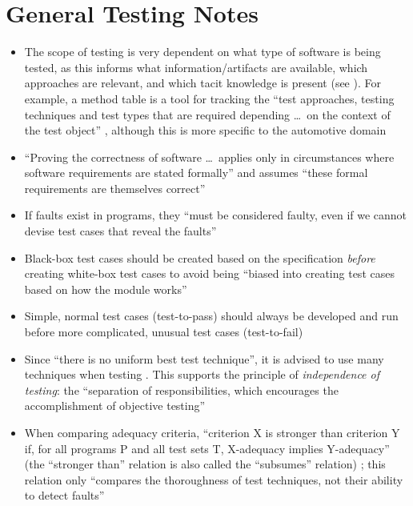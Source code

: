 \section{General Testing Notes}

\begin{itemize}
      \item The scope of testing is very dependent on what type of software
            is being tested, as this informs what information/artifacts are
            available, which approaches are relevant, and which tacit knowledge
            is present (see ). For example, a method table
            is a tool for tracking the ``test approaches, testing techniques
            and test types that are required depending \dots\ on the context of
            the test object'' \citepISTQB{} , although
            this is more specific to the automotive domain
      \item ``Proving the correctness of software \dots\ applies only in
            circumstances where software requirements are stated formally'' and
            assumes ``these formal requirements are themselves correct''
            \citep[p.~398]{vanVliet2000}
      \item If faults exist in programs, they ``must be considered faulty, even
            if we cannot devise test cases that reveal the faults''
            \citep[p.~401]{vanVliet2000}
      \item Black-box test cases should be created based on the specification
            \emph{before} creating white-box test cases to avoid being ``biased
            into creating test cases based on how the module works''
            \citep[p.~113]{Patton2006}
      \item Simple, normal test cases (test-to-pass) should always be developed
            and run before more complicated, unusual test cases (test-to-fail)
            \citep[p.~66]{Patton2006}
      \item Since ``there is no uniform best test technique'', it is advised to
            use many techniques when testing \citep[p.~440]{vanVliet2000}.
            This supports the principle of \emph{independence of testing}: the
            ``separation of responsibilities, which encourages the
            accomplishment of objective testing'' \citepISTQB{}
      \item When comparing adequacy criteria, ``criterion X is stronger than
            criterion Y if, for all programs P and all test sets T, X-adequacy
            implies Y-adequacy'' (the ``stronger than'' relation is also called
            the ``subsumes'' relation) \citep[p.~432]{vanVliet2000};
            this relation only ``compares the thoroughness of test techniques,
            not their ability to detect faults'' \citep[p.~434]{vanVliet2000}
\end{itemize}

